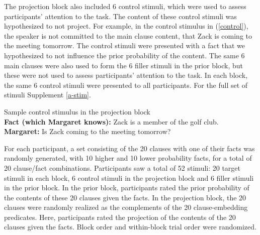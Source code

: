 \documentclass[11pt,fleqn]{article}
\newcommand{\6}{\mbox{$[\hspace*{-.6mm}[$}}
\newcommand{\9}{\mbox{$]\hspace*{-.6mm}]$}}
\begin{document}
The projection block also included 6 control stimuli, which were used to assess participants' attention to the task. The content of these control stimuli was hypothesized to not project. For example, in the control stimulus in (\ref{control}), the speaker is not committed to the main clause content, that Zack is coming to the meeting tomorrow. The control stimuli were presented with a fact that we hypothesized to not influence the prior probability of the content. The same 6 main clauses were also used to form the 6 filler stimuli in the prior block, but these were not used to assess participants' attention to the task. In each block, the same 6 control stimuli were presented to all participants. For the full set of stimuli Supplement \ref{a-stim}.

\begin{exe}
\ex\label{control} Sample control stimulus in the projection block \\ {\bf Fact (which Margaret knows):}  Zack is a member of the golf club. \\ {\bf Margaret:} Is Zack coming to the meeting tomorrow?
\end{exe}


For each participant, a set consisting of the 20 clauses with one of their facts was randomly generated, with 10 higher and 10 lower probability facts, for a total of 20 clause/fact combinations. Participants saw a total of 52 stimuli: 20 target stimuli in each block, 6 control stimuli in the projection block and 6 filler stimuli in the prior block. In the prior block, participants rated the prior probability of the contents of these 20 clauses given the facts. In the projection block, the 20 clauses were randomly realized as the complements of the 20 clause-embedding predicates. Here, participants rated the projection of the contents of the 20 clauses given the facts. Block order and within-block trial order were randomized.
\end{document}
